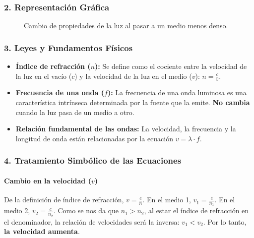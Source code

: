 \subsubsection*{2. Representación Gráfica}
\begin{figure}[H]
    \centering
    \caption{Cambio de propiedades de la luz al pasar a un medio menos denso.}
\end{figure}

\subsubsection*{3. Leyes y Fundamentos Físicos}
\begin{itemize}
    \item \textbf{Índice de refracción ($n$):} Se define como el cociente entre la velocidad de la luz en el vacío ($c$) y la velocidad de la luz en el medio ($v$): $n = \frac{c}{v}$.
    \item \textbf{Frecuencia de una onda ($f$):} La frecuencia de una onda luminosa es una característica intrínseca determinada por la fuente que la emite. \textbf{No cambia} cuando la luz pasa de un medio a otro.
    \item \textbf{Relación fundamental de las ondas:} La velocidad, la frecuencia y la longitud de onda están relacionadas por la ecuación $v = \lambda \cdot f$.
\end{itemize}

\subsubsection*{4. Tratamiento Simbólico de las Ecuaciones}
\paragraph*{Cambio en la velocidad ($v$)}
De la definición de índice de refracción, $v = \frac{c}{n}$.
En el medio 1, $v_1 = \frac{c}{n_1}$.
En el medio 2, $v_2 = \frac{c}{n_2}$.
Como se nos da que $n_1 > n_2$, al estar el índice de refracción en el denominador, la relación de velocidades será la inversa: $v_1 < v_2$. Por lo tanto, \textbf{la velocidad aumenta}.

